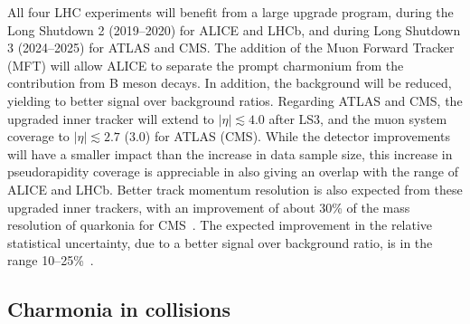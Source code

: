 \documentclass[../report.tex]{subfiles}
\begin{document}
All four LHC experiments will benefit from a large upgrade program, during the Long Shutdown 2 (2019--2020) for ALICE and LHCb, and during Long Shutdown 3 (2024--2025) for ATLAS and CMS.
The addition of the Muon Forward Tracker (MFT) will allow ALICE to separate the prompt charmonium from the contribution from B meson decays. In addition, the background will be reduced, yielding to better signal over background ratios. 
Regarding ATLAS and CMS, the upgraded inner tracker will extend to $|\eta|\lesssim 4.0$ after LS3, and the muon system coverage to $|\eta|\lesssim 2.7$ (3.0) for ATLAS (CMS). While the detector improvements will have a smaller impact than the
increase in data sample size, this increase in pseudorapidity coverage is appreciable in also giving an overlap with the range of ALICE and LHCb.
Better track momentum resolution is also expected from these upgraded inner trackers, with an improvement of about 30\% of the mass resolution of quarkonia for CMS~\cite{CMSCollaboration:2015zni}. The expected improvement in the 
relative statistical uncertainty, due to a better signal over background ratio, is in the range 10--25\%~\cite{CMS-PAS-FTR-18-024}.

\subsection{Charmonia in \PbPb collisions} %
\end{document}
